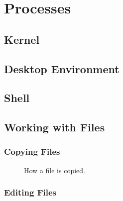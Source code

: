 \section{Processes}

\subsection{Kernel}

\subsection{Desktop Environment}

\subsection{Shell}

\subsection{Working with Files}

\subsubsection{Copying Files}

\begin{figure}[tbp]
  
  \caption{How a file is copied.}
  \label{fig:bg:processes:copy}
\end{figure}

\subsubsection{Editing Files}
